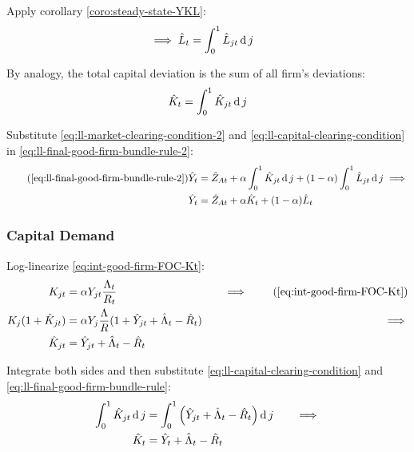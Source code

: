 \documentclass[
thesis.tex
]{subfiles}
\begin{document}
	Apply corollary \ref{coro:steady-state-YKL}:
	\begin{align}
		\implies \hat{L}_t &= \int_{0}^{1} \hat{L}_{jt} \operatorname{d} j \label{eq:ll-market-clearing-condition-2}
	\end{align}
	
	By analogy, the total capital deviation is the sum of all firm's deviations:
	\begin{align}
		\hat{K}_t = \int_{0}^{1} \hat{K}_{jt} \operatorname{d} j \label{eq:ll-capital-clearing-condition}
	\end{align}
	
	Substitute \ref{eq:ll-market-clearing-condition-2} and \ref{eq:ll-capital-clearing-condition} in \ref{eq:ll-final-good-firm-bundle-rule-2}:
	\begin{align}
		\tag{\ref{eq:ll-final-good-firm-bundle-rule-2}}
		\hat{Y}_t &= \hat{Z}_{At} + \alpha \int_{0}^{1} \hat{K}_{jt} \dif j + (1-\alpha) \int_{0}^{1} \hat{L}_{jt} \dif j \implies \\
		\hat{Y}_t &= \hat{Z}_{At} + \alpha \hat{K}_t + (1-\alpha) \hat{L}_t \label{eq:ll-final-good-firm-bundle-rule-3}
	\end{align}
	
	
	\subsubsection*{Capital Demand}
	
	Log-linearize \ref{eq:int-good-firm-FOC-Kt}:
	\begin{alignat}{2}
		K_{jt} &= \alpha Y_{jt} \frac{\Lambda_t}{R_t} &\implies \tag{\ref{eq:int-good-firm-FOC-Kt}} \\
		K_j (1+ \hat{K}_{jt}) &= \alpha Y_{j} \frac{\Lambda}{R} (1+ \hat{Y}_{jt} + \hat{\Lambda}_t - \hat{R}_t) \quad &\implies \nonumber \\
		\hat{K}_{jt} &= \hat{Y}_{jt} + \hat{\Lambda}_t - \hat{R}_t \nonumber
	\end{alignat}
	
	Integrate both sides and then substitute \ref{eq:ll-capital-clearing-condition} and \ref{eq:ll-final-good-firm-bundle-rule}:
	\begin{alignat}{2}
		\int_{0}^{1} \hat{K}_{jt} \operatorname{d} j &= \int_{0}^{1} \left( \hat{Y}_{jt} + \hat{\Lambda}_t - \hat{R}_t \right) \operatorname{d} j \quad &\implies \nonumber \\
		\hat{K}_t &= \hat{Y}_t + \hat{\Lambda}_t - \hat{R}_t \label{eq:ll-int-good-firm-FOC-Kt}
	\end{alignat}
	
\end{document}
